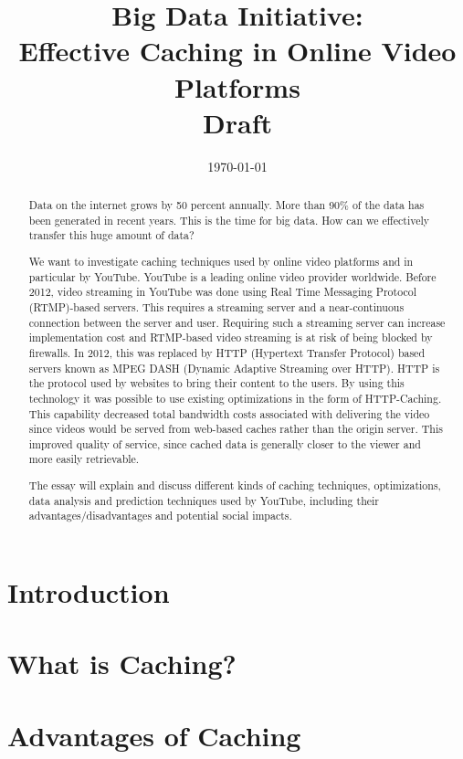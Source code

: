 \documentclass[a4paper,12pt]{article}
\title{Big Data Initiative:\\Effective Caching in Online Video Platforms\\Draft\ednote{Remove draft status}}
\date{\today}
\begin{document}
\maketitle

\begin{abstract}
  Data on the internet grows by 50 percent annually. More than 90\% of the data has been generated in recent years. This is the time for big data. How can we effectively transfer this huge amount of data?

  We want to investigate caching techniques used by online video platforms and in particular by YouTube. YouTube is a leading online video provider worldwide. Before 2012, video streaming in YouTube was done using Real Time Messaging Protocol (RTMP)-based servers. This requires a streaming server and a near-continuous connection between the server and user. Requiring such a streaming server can increase implementation cost and RTMP-based video streaming is at risk of being blocked by firewalls. In 2012, this was replaced by HTTP (Hypertext Transfer Protocol) based servers known as MPEG DASH (Dynamic Adaptive Streaming over HTTP). HTTP is the protocol used by websites to bring their content to the users. By using this technology it was possible to use existing optimizations in the form of HTTP-Caching. This capability decreased total bandwidth costs associated with delivering the video since videos would be served from web-based caches rather than the origin server. This improved quality of service, since cached data is generally closer to the viewer and more easily retrievable.

  The essay will explain and discuss different kinds of caching techniques, optimizations, data analysis and prediction techniques used by YouTube, including their advantages/disadvantages and potential social impacts.
\end{abstract}

\newpage

\tableofcontents

\newpage
\section{Introduction}


\section{What is Caching?}


\section{Advantages of Caching}

\end{document}
